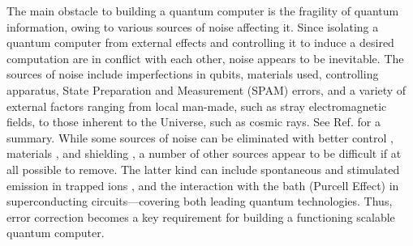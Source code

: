 \documentclass{article}
\begin{document}
The main obstacle to building a quantum computer is the fragility of quantum information, owing to various sources of noise affecting it.  Since isolating a quantum computer from external effects and controlling it to induce a desired computation are in conflict with each other, noise appears to be inevitable.  The sources of noise include imperfections in qubits, materials used, controlling apparatus, State Preparation and Measurement (SPAM) errors, and a variety of external factors ranging from local man-made, such as stray electromagnetic fields, to those inherent to the Universe, such as cosmic rays. See Ref. \cite{gambetta2017building} for a summary.  While some sources of noise can be eliminated with better control \cite{mundada2023experimental}, materials \cite{de2021materials}, and shielding \cite{10.1063/1.3658630, vepsalainen2020impact, PRXQuantum.4.020356}, a number of other sources appear to be difficult if at all possible to remove.  The latter kind can include spontaneous and stimulated emission in trapped ions \cite{wu2018noise,boguslawski2023raman}, and the interaction with the bath (Purcell Effect) \cite{Houck2008} in superconducting circuits---covering both leading quantum technologies.  
Thus, error correction becomes a key requirement for building a functioning scalable quantum computer.
\end{document}
